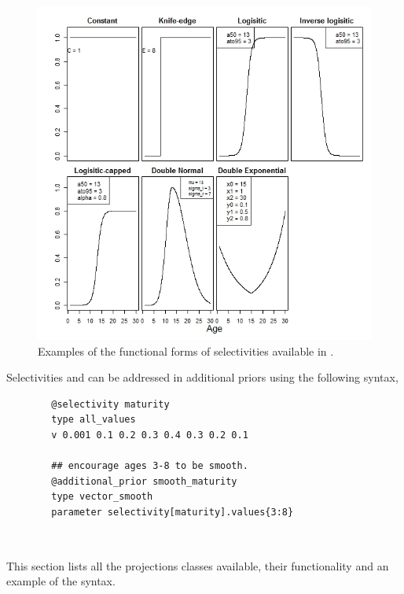 \begin{figure}[H]
	\includegraphics[scale = 0.7]{Figures/Selectivities.jpeg}
	\caption{Examples of the functional forms of selectivities available in \CNAME.}
\end{figure}

Selectivities  and  can be addressed in additional priors using the following syntax,

{\small{\begin{verbatim}
		@selectivity maturity
		type all_values
		v 0.001 0.1 0.2 0.3 0.4 0.3 0.2 0.1
		
		## encourage ages 3-8 to be smooth.
		@additional_prior smooth_maturity
		type vector_smooth
		parameter selectivity[maturity].values{3:8}
		
		\end{verbatim}}}

\subsection{\label{sec:projections}}

This section lists all the projections classes available, their functionality and an example of the syntax.

\subsubsection[Constant]{}

